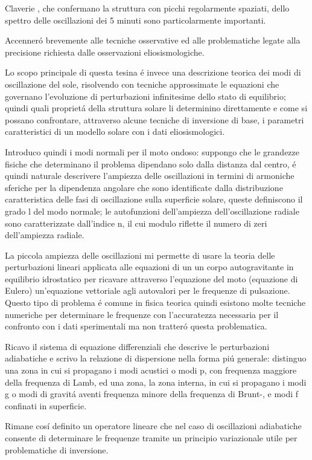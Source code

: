 \documentclass[oneside,12pt,fleqn]{memoir}
\begin{document}
Claverie , che confermano la struttura con picchi regolarmente spaziati, dello spettro delle oscillazioni dei 5 minuti sono particolarmente importanti.

Accenner\'o brevemente alle tecniche osservative ed alle problematiche legate alla precisione richiesta dalle osservazioni eliosismologiche.

Lo scopo principale di questa tesina \'e invece una descrizione teorica dei modi di oscillazione del sole, risolvendo con tecniche approssimate le equazioni che governano l'evoluzione di perturbazioni infinitesime dello stato di equilibrio; quindi quali propriet\'a della struttura solare li determinino direttamente e come si possano confrontare, attraverso alcune tecniche di inversione di base, i parametri caratteristici di un modello solare con i dati eliosismologici.

Introduco quindi i modi normali per il moto ondoso: suppongo che le grandezze fisiche che determinano il problema dipendano solo dalla distanza dal centro, \'e quindi naturale descrivere l'ampiezza delle oscillazioni  in termini di armoniche sferiche per la dipendenza angolare che sono identificate dalla distribuzione caratteristica delle fasi di oscillazione sulla superficie solare, queste definiscono il grado l del modo normale; le autofunzioni dell'ampiezza dell'oscillazione radiale sono caratterizzate dall'indice n, il cui modulo riflette il numero di zeri dell'ampiezza radiale.

La piccola ampiezza delle oscillazioni mi permette di usare la teoria delle perturbazioni lineari applicata alle equazioni di un un corpo autogravitante in equilibrio idrostatico per ricavare attraverso l'equazione del moto (equazione di Eulero) un'equazione vettoriale agli autovalori per le frequenze di pulsazione. Questo tipo di problema \'e comune in fisica teorica quindi esistono molte tecniche numeriche per determinare le frequenze con l'accuratezza necessaria per il confronto con i dati sperimentali ma non tratter\'o questa problematica.


Ricavo il sistema di equazione differenziali che descrive le perturbazioni adiabatiche e scrivo la relazione di dispersione nella forma pi\'u generale: distinguo una zona in cui si propagano i modi acustici o modi p, con frequenza maggiore della frequenza di Lamb, ed una zona, la zona interna, in cui si propagano i modi g o modi di gravit\'a aventi frequenza minore della frequenza di Brunt-\vai{}, e modi f confinati in superficie. 


Rimane cos\'i definito un operatore lineare che nel caso di oscillazioni adiabatiche consente di determinare le frequenze tramite un principio variazionale utile per problematiche di inversione. 
\end{document}
